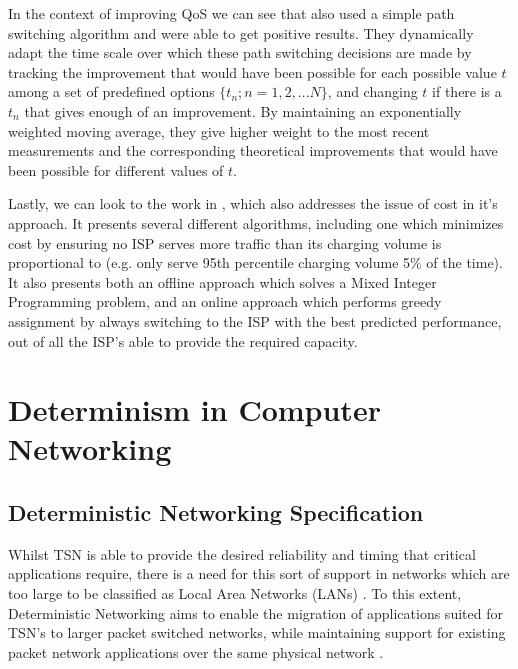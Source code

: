 In the context of improving QoS we can see that \cite{tao2005improving} also used a simple path switching algorithm and were able to get positive results. They dynamically adapt the time scale over which these path switching decisions are made by tracking the improvement that would have been possible for each possible value $t$ among a set of predefined options $\{t_n;n = 1,2, ... N\}$, and changing $t$ if there is a $t_n$ that gives enough of an improvement. By maintaining an exponentially weighted moving average, they give higher weight to the most recent measurements and the corresponding theoretical improvements that would have been possible for different values of $t$.

Lastly, we can look to the work in \cite{goldenberg2004optimizing}, which also addresses the issue of cost in it's approach. It presents several different algorithms, including one which minimizes cost by ensuring no ISP serves more traffic than its charging volume is proportional to (e.g. only serve 95th percentile charging volume 5\% of the time). It also presents both an offline approach which solves a Mixed Integer Programming problem, and an online approach which performs greedy assignment by always switching to the ISP with the best predicted performance, out of all the ISP's able to provide the required capacity.


\section{Determinism in Computer Networking}


\subsection{Deterministic Networking Specification}

Whilst TSN is able to provide the desired reliability and timing that critical applications require, there is a need for this sort of support in networks which are too large to be classified as Local Area Networks (LANs) \cite{detnet-use-cases, detnet-problem-statement}. To this extent, Deterministic Networking aims to enable the migration of applications suited for TSN's to larger packet switched networks, while maintaining support for existing packet network applications over the same physical network \cite{detnet-problem-statement}.

